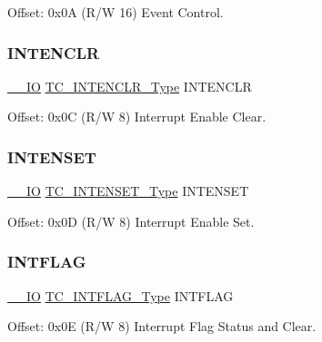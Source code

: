 Offset\+: 0x0A (R/W 16) Event Control. 

\mbox{\label{struct_tc_count8_a1076512cb13382301c336e0646e655f6}} 
\subsubsection{\texorpdfstring{INTENCLR}{INTENCLR}}
{\footnotesize\ttfamily \mbox{\hyperlink{core__cm0plus_8h_aec43007d9998a0a0e01faede4133d6be}{\+\_\+\+\_\+\+IO}} \mbox{\hyperlink{union_t_c___i_n_t_e_n_c_l_r___type}{T\+C\+\_\+\+I\+N\+T\+E\+N\+C\+L\+R\+\_\+\+Type}} I\+N\+T\+E\+N\+C\+LR}



Offset\+: 0x0C (R/W 8) Interrupt Enable Clear. 

\mbox{\label{struct_tc_count8_a59e384762759e5950e3d32d1f3b358d6}} 
\subsubsection{\texorpdfstring{INTENSET}{INTENSET}}
{\footnotesize\ttfamily \mbox{\hyperlink{core__cm0plus_8h_aec43007d9998a0a0e01faede4133d6be}{\+\_\+\+\_\+\+IO}} \mbox{\hyperlink{union_t_c___i_n_t_e_n_s_e_t___type}{T\+C\+\_\+\+I\+N\+T\+E\+N\+S\+E\+T\+\_\+\+Type}} I\+N\+T\+E\+N\+S\+ET}



Offset\+: 0x0D (R/W 8) Interrupt Enable Set. 

\mbox{\label{struct_tc_count8_a076bcac2737bf4d77b94d8ca8362a8f0}} 
\subsubsection{\texorpdfstring{INTFLAG}{INTFLAG}}
{\footnotesize\ttfamily \mbox{\hyperlink{core__cm0plus_8h_aec43007d9998a0a0e01faede4133d6be}{\+\_\+\+\_\+\+IO}} \mbox{\hyperlink{union_t_c___i_n_t_f_l_a_g___type}{T\+C\+\_\+\+I\+N\+T\+F\+L\+A\+G\+\_\+\+Type}} I\+N\+T\+F\+L\+AG}



Offset\+: 0x0E (R/W 8) Interrupt Flag Status and Clear. 

